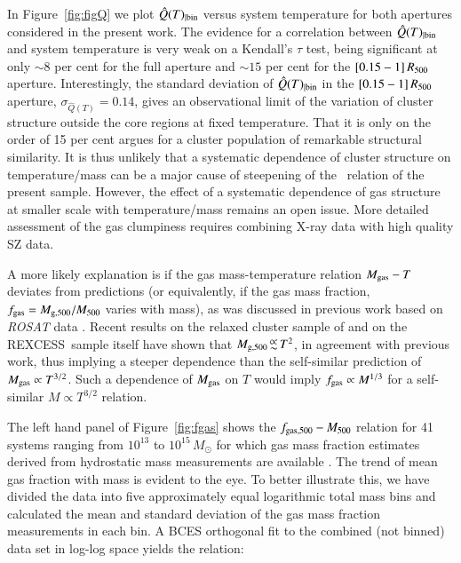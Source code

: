 \documentclass[oldversion]{aa}
\newcommand{\rexcess}{{\gwpfont REXCESS}}
\begin{document}
In Figure~\ref{fig:figQ} we plot $\hat{Q}(T)_{|\rm bin}$ versus system temperature for both apertures considered in the present work. The evidence for a
correlation between $\hat{Q}(T)_{|\rm bin}$ and system temperature is very weak on a Kendall's $\tau$ test, being 
significant at only $\sim 8$ per cent for the full aperture and $\sim 15$ per cent for the $[0.15-1]\,R_{500}$ aperture. Interestingly, the standard deviation of $\hat{Q}(T)_{| \rm bin}$ in the $[0.15-1]\,R_{500}$ aperture, $\sigma_{\hat{Q}(T)} = 0.14$, gives an observational limit of the variation of cluster structure outside the core regions at fixed temperature. That it is only on the order of 15 per cent argues for a cluster population of remarkable structural similarity. It is thus unlikely that a systematic dependence of cluster structure on temperature/mass can be a major cause of steepening of the \LxT\ relation of the present sample. However, the effect of a systematic dependence of gas structure at smaller scale with temperature/mass remains an open issue. More detailed assessment of the gas clumpiness requires combining X-ray data with high quality SZ data. 

A more likely explanation is if the gas mass-temperature relation
$M_{\rm gas}-T$ deviates from predictions (or equivalently, if the gas
mass fraction, $f_{\rm gas} = M_{\rm g,500}/M_{\rm 500}$ varies with mass), as was discussed in previous work based on {\it ROSAT\/} data \citep[e.g.,][]{na01,mme99}. Recent
results on the relaxed cluster sample of \citet{app07} and on the
\rexcess\ sample itself \citep{croston08} have shown that $M_{\rm
g,500} \propsim T^{2}$, in agreement with previous work, thus implying a steeper dependence than the self-similar prediction of
$M_{\rm gas} \propto T^{3/2}$. Such a dependence of $M_{\rm gas}$ on
$T$ would imply $f_{\rm gas} \propto M^{1/3}$ for a self-similar $M
\propto T^{3/2}$ relation. 

The left hand panel of Figure~\ref{fig:fgas} shows the $f_{\rm
gas,500}-M_{500}$ relation for 41 systems ranging from $10^{13}$ to $10^{15}\,M_\odot$ for which gas mass fraction estimates derived from hydrostatic mass measurements are available \citep{app07,vikh06,sun08}. The trend of mean gas fraction with mass is evident to the eye. To better illustrate this, we have divided the data into five approximately equal logarithmic total mass bins and calculated the mean and standard deviation of the gas mass fraction measurements in each bin.  A BCES orthogonal fit to the combined (not binned) data set in log-log space yields the relation:
\end{document}

